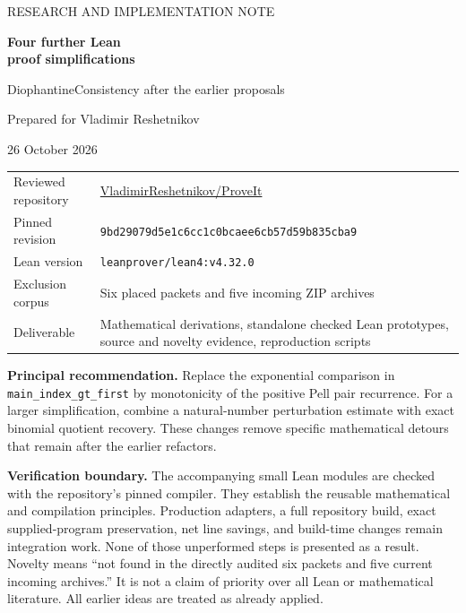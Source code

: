 \documentclass[11pt,a4paper]{article}
\newcommand{\code}[1]{\nolinkurl{#1}}
\begin{document}
\hypersetup{pageanchor=false}
\begin{titlepage}
\vspace*{12mm}
{\color{accent}\large RESEARCH AND IMPLEMENTATION NOTE}\par
\vspace{9mm}
{\color{ink}\Huge\bfseries Four further Lean\\[4pt]proof simplifications}\par
\vspace{6mm}
{\LARGE DiophantineConsistency after the earlier proposals}\par
\vspace{10mm}
{\large Prepared for Vladimir Reshetnikov\par 26 October 2026}\par
\vspace{13mm}
\begin{tabularx}{\textwidth}{@{}lY@{}}
\toprule
Reviewed repository & \href{https://github.com/VladimirReshetnikov/ProveIt}{VladimirReshetnikov/ProveIt}\\
Pinned revision & \code{9bd29079d5e1c6cc1c0bcaee6cb57d59b835cba9}\\
Lean version & \code{leanprover/lean4:v4.32.0}\\
Exclusion corpus & Six placed packets and five incoming ZIP archives\\
Deliverable & Mathematical derivations, standalone checked Lean prototypes, source and novelty evidence, reproduction scripts\\
\bottomrule
\end{tabularx}\par
\vspace{8mm}
\textbf{Principal recommendation.} Replace the exponential comparison in
\code{main_index_gt_first} by monotonicity of the positive Pell pair recurrence.
For a larger simplification, combine a natural-number perturbation estimate with
exact binomial quotient recovery. These changes remove specific mathematical
detours that remain after the earlier refactors.

\textbf{Verification boundary.} The accompanying small Lean modules are checked
with the repository's pinned compiler. They establish the reusable mathematical
and compilation principles. Production adapters, a full repository build,
exact supplied-program preservation, net line savings, and build-time changes
remain integration work. None of those unperformed steps is presented as a result.
\vfill
{\small Novelty means ``not found in the directly audited six packets and five
current incoming archives.'' It is not a claim of priority over all Lean or
mathematical literature. All earlier ideas are treated as already applied.}
\end{titlepage}
\hypersetup{pageanchor=true}
\tableofcontents
\clearpage
{}
\end{document}
